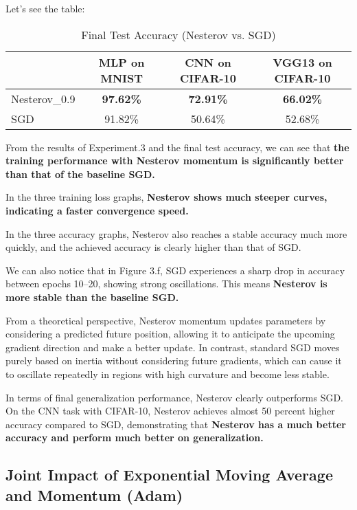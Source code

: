 \documentclass[12pt]{article}
\begin{document}
Let's see the table:

\begin{table}[H]
\centering
\caption{Final Test Accuracy (Nesterov vs. SGD)}
\label{tab:nesterov_vs_sgd}
\begin{tabular}{|l|c|c|c|}
\hline
             & MLP on MNIST & CNN on CIFAR-10 & VGG13 on CIFAR-10 \\ \hline
Nesterov\_0.9 & \textbf{97.62\%} & \textbf{72.91\%}  & \textbf{66.02\%}    \\ \hline
SGD          & 91.82\%      & 50.64\%         & 52.68\%           \\ \hline
\end{tabular}
\end{table}


From the results of Experiment.3 and the final test accuracy, we can see that \textbf{the training performance with Nesterov momentum is significantly better than that of the baseline SGD.}

In the three training loss graphs, \textbf{Nesterov shows much steeper curves, indicating a faster convergence speed.}

In the three accuracy graphs, Nesterov also reaches a stable accuracy much more quickly, and the achieved accuracy is clearly higher than that of SGD.

We can also notice that in Figure 3.f, SGD experiences a sharp drop in accuracy between epochs 10–20, showing strong oscillations. This means \textbf{Nesterov is more stable than the baseline SGD.}

From a theoretical perspective, Nesterov momentum updates parameters by considering a predicted future position, allowing it to anticipate the upcoming gradient direction and make a better update. In contrast, standard SGD moves purely based on inertia without considering future gradients, which can cause it to oscillate repeatedly in regions with high curvature and become less stable.

In terms of final generalization performance, Nesterov clearly outperforms SGD. On the CNN task with CIFAR-10, Nesterov achieves almost 50 percent higher accuracy compared to SGD, demonstrating that \textbf{Nesterov has a much better accuracy and perform much better on generalization.}


\subsection{Joint Impact of Exponential Moving Average and Momentum (Adam)}
\end{document}
